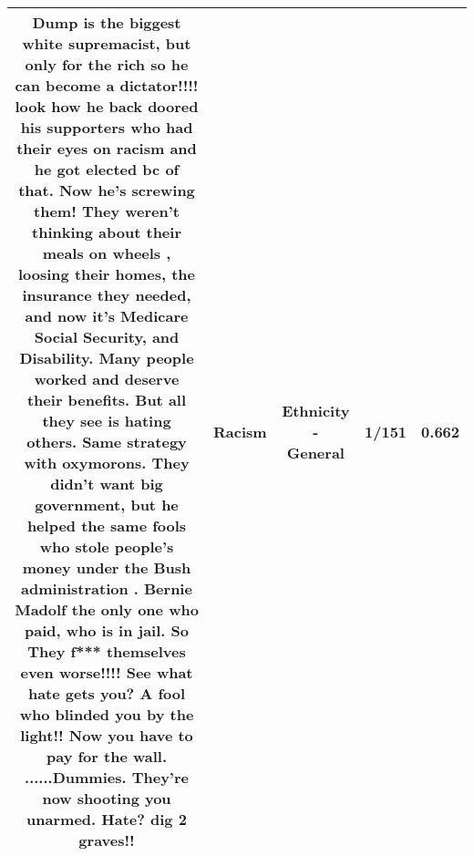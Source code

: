 \documentclass[11pt]{article}
\newlength\mylength
\begin{document}
\begin{center}
\begin{longtable}{|C{.65\mylength}|C{.30\mylength}|C{.12\mylength}|C{.12\mylength}|C{.12\mylength}|}
  \small Dump is the biggest white supremacist, but only for the rich so he can become a dictator!!!! look how he back doored his supporters who had their eyes on \textbf{racism} and he got elected  bc of that.  Now he's screwing them! They weren't thinking about their meals on wheels , loosing their homes, the insurance they needed, and now it's Medicare Social Security, and Disability.  Many people worked and deserve their benefits. But all they see is hating others. Same strategy with oxymorons. They didn't want big government, but he helped the same fools who stole people's money under the Bush administration . Bernie Madolf the only one who paid,  who is in jail.  So They f*** themselves even worse!!!! See what hate gets you? A fool who blinded you by the light!! Now you have to pay for the wall. ......Dummies.  They're now shooting you unarmed.  Hate?  dig 2 graves!!\normalsize   & Racism & Ethnicity - General & 1/151 & 0.662 \\  \hline

\end{longtable}
\end{center}
\end{document}
